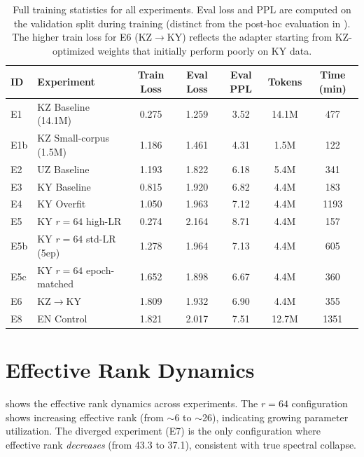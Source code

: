 \documentclass[11pt]{article}
\begin{document}
\begin{table}[t]
\centering
\small
\begin{tabular}{llccccc}
\toprule
\textbf{ID} & \textbf{Experiment} & \textbf{Train Loss} & \textbf{Eval Loss} & \textbf{Eval PPL} & \textbf{Tokens} & \textbf{Time (min)} \\
\midrule
E1 & KZ Baseline (14.1M) & 0.275 & 1.259 & 3.52 & 14.1M & 477 \\
E1b & KZ Small-corpus (1.5M) & 1.186 & 1.461 & 4.31 & 1.5M & 122 \\
E2 & UZ Baseline & 1.193 & 1.822 & 6.18 & 5.4M & 341 \\
E3 & KY Baseline & 0.815 & 1.920 & 6.82 & 4.4M & 183 \\
E4 & KY Overfit & 1.050 & 1.963 & 7.12 & 4.4M & 1193 \\
E5 & KY $r{=}64$ high-LR & 0.274 & 2.164 & 8.71 & 4.4M & 157 \\
E5b & KY $r{=}64$ std-LR (5ep) & 1.278 & 1.964 & 7.13 & 4.4M & 605 \\
E5c & KY $r{=}64$ epoch-matched & 1.652 & 1.898 & 6.67 & 4.4M & 360 \\
E6 & KZ$\rightarrow$KY & 1.809 & 1.932 & 6.90 & 4.4M & 355 \\
E8 & EN Control & 1.821 & 2.017 & 7.51 & 12.7M & 1351 \\
\bottomrule
\end{tabular}
\caption{Full training statistics for all experiments. Eval loss and PPL are computed on the validation split during training (distinct from the post-hoc evaluation in ). The higher train loss for E6 (KZ$\rightarrow$KY) reflects the adapter starting from KZ-optimized weights that initially perform poorly on KY data.}
\label{tab:training_details}
\end{table}

\section{Effective Rank Dynamics}
\label{app:effrank}

 shows the effective rank dynamics across experiments. The $r{=}64$ configuration shows increasing effective rank (from $\sim$6 to $\sim$26), indicating growing parameter utilization. The diverged experiment (E7) is the only configuration where effective rank \emph{decreases} (from 43.3 to 37.1), consistent with true spectral collapse.
\end{document}
